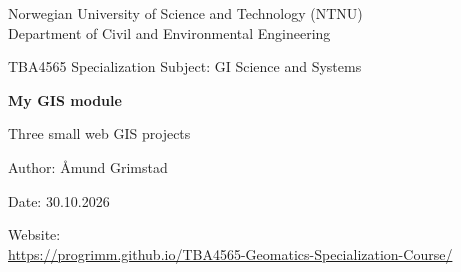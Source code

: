\documentclass[11pt,a4paper]{article}
\newcommand{\siteurl}{\url{https://progrimm.github.io/TBA4565-Geomatics-Specialization-Course/}}
\begin{document}
\begin{titlepage}
\centering
{\large Norwegian University of Science and Technology (NTNU)\\
Department of Civil and Environmental Engineering\par}
\vspace{4cm}
{\large TBA4565 Specialization Subject: GI Science and Systems\par}
\vspace{0.8cm}
{\huge\bfseries My GIS module\par}
\vspace{0.4cm}
{\Large Three small web GIS projects\par}
\vfill
{\large Author: Åmund Grimstad\par}
\vspace{0.3cm}
{\large Date: 30.10.2026\par}
\vspace{0.3cm}
{\footnotesize Website:\\ \siteurl\par}
\end{titlepage}

\tableofcontents
\clearpage









\end{document}
